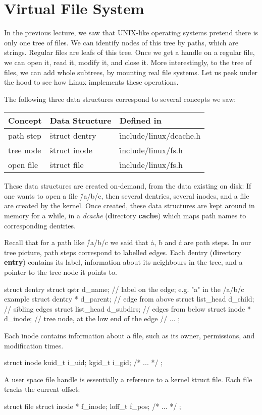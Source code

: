 


\section*{Virtual File System}

In the previous lecture,
  we saw that UNIX-like operating systems pretend there is only one tree of files.
We can identify nodes of this tree by paths, which are strings.
Regular files are leafs of this tree.
Once we get a handle on a regular file,
  we can open it, read it, modify it, and close it.
More interestingly, to the tree of files,
  we can add whole subtrees, by mounting real file systems.
Let us peek under the hood to see how Linux implements these operations.

The following three data structures correspond to several concepts we saw:
\begin{center}
\begin{tabular}{@{}lll@{}}
\toprule
Concept & Data Structure & Defined in \\
\midrule
path step & \.{struct dentry} & \.{include/linux/dcache.h} \\
tree node & \.{struct inode} & \.{include/linux/fs.h} \\
open file & \.{struct file} & \.{include/linux/fs.h} \\
\bottomrule
\end{tabular}
\end{center}
These data structures are created on-demand, from the data existing on disk:
If one wants to open a file \.{/a/b/c},
  then several dentries, several inodes, and a file are created by the kernel.
Once created, these data structures are kept around in memory for a while,
  in a \emph{dcache} ({\bf d}irectory {\bf cache})
    which maps path names to corresponding dentries.

Recall that for a path like \.{/a/b/c}
  we said that \.{a}, \.{b} and \.{c} are path steps.
In our tree picture,
  path steps correspond to labelled edges.
Each \.{dentry} ({\bf d}irectory {\bf entry}) contains
  its label,
  information about its neighbours in the tree,
  and a pointer to the tree node it points to.
\begin{ccode}
struct dentry {
  struct qstr d_name;  // label on the edge; e.g. "a" in the  /a/b/c example
  struct dentry * d_parent; // edge from above
  struct list_head d_child; // sibling edges
  struct list_head d_subdirs; // edges from below
  struct inode * d_inode; // tree node, at the low end of the edge
  // ...
};
\end{ccode}
Each \.{inode} contains information about a file,
  such as its owner, permissions, and modification times.
\begin{ccode}
struct inode { kuid_t i_uid; kgid_t i_gid; /* ... */ };
\end{ccode}
A user space file handle is essentially a reference to a kernel \.{struct file}.
Each \.{file} tracks the current offset:
\begin{ccode}
struct file { struct inode * f_inode;  loff_t f_pos; /* ... */ };
\end{ccode}

